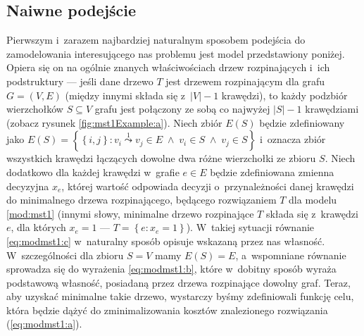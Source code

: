 \subsection{Naiwne podejście}



Pierwszym i~zarazem najbardziej naturalnym sposobem podejścia do zamodelowania interesującego nas problemu jest model przedstawiony poniżej.
Opiera się on na ogólnie znanych właściwościach drzew rozpinających i~ich podstruktury --- jeśli dane drzewo $T$ jest drzewem rozpinającym dla grafu $G = \left( V, E \right)$ (między innymi składa się z~$\left| V \right| - 1$ krawędzi), to każdy podzbiór wierzchołków $S \subseteq V$ grafu jest połączony ze sobą co najwyżej $\left| S \right| - 1$ krawędziami (zobacz rysunek \ref{fig:mst1Example:a}).
Niech zbiór $E \left( S \right)$ będzie zdefiniowany jako $E \left( S \right) = \left\{ \left\{ i, j \right\} : v_{i} \overset{1}\leadsto v_{j} \in E \; \wedge \; v_{i} \in S \; \wedge \; v_{j} \in S \right\}$ i~oznacza zbiór wszystkich krawędzi łączących dowolne dwa różne wierzchołki ze zbioru $S$.
Niech dodatkowo dla każdej krawędzi w~grafie $e \in E$ będzie zdefiniowana zmienna decyzyjna $x_{e}$, której wartość odpowiada decyzji o~przynależności danej krawędzi do minimalnego drzewa rozpinającego, będącego rozwiązaniem $T$ dla modelu \ref{mod:mst1} (innymi słowy, minimalne drzewo rozpinające $T$ składa się z~krawędzi $e$, dla których $x_{e} = 1$ --- $T = \left\{ e : x_{e} = 1 \right\}$).
W~takiej sytuacji równanie \ref{eq:modmst1:c} w~naturalny sposób opisuje wskazaną przez nas własność.
W~szczególności dla zbioru $S = V$ mamy $E \left( S \right) = E$, a~wspomniane równanie sprowadza się do wyrażenia \ref{eq:modmst1:b}, które w~dobitny sposób wyraża podstawową własność, posiadaną przez drzewa rozpinające dowolny graf.
Teraz, aby uzyskać minimalne takie drzewo, wystarczy byśmy zdefiniowali funkcję celu, która będzie dążyć do zminimalizowania kosztów znalezionego rozwiązania (\ref{eq:modmst1:a}).

